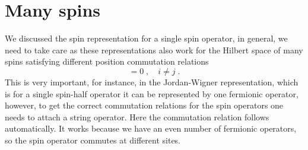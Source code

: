 \section{Many spins}

We discussed the spin representation for a single spin operator, in general, we need to take care as these representations also work for the Hilbert space of many spins satisfying different position commutation relations
\begin{equation}
    [ S_i^\alpha \, , \, S_j^\beta ] = 0  \; , \quad i\neq j \; .
\end{equation}
This is very important, for instance, in the Jordan-Wigner representation, which is for a single spin-half operator it can be represented by one fermionic operator, however, to get the correct commutation relations for the spin operators one needs to attach a string operator.
Here the commutation relation follows automatically.
It works because we have an even number of fermionic operators, so the spin operator commutes at different sites.




